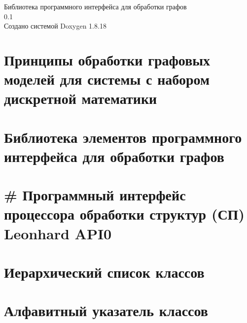 \let\mypdfximage\pdfximage\def\pdfximage{\immediate\mypdfximage}\documentclass[twoside]{book}
\newcommand{\+}{\discretionary{\mbox{\scriptsize$\hookleftarrow$}}{}{}}
\newcommand{\clearemptydoublepage}{%
  \newpage{\pagestyle{empty}\cleardoublepage}%
}
\begin{document}
\hypersetup{pageanchor=false,
             bookmarksnumbered=true,
             pdfencoding=unicode
            }
\begin{titlepage}
\vspace*{7cm}
\begin{center}%
{\Large Библиотека программного интерфейса для обработки графов \\[1ex]\large 0.\+1 }\\
\vspace*{1cm}
{\large Создано системой Doxygen 1.8.18}\\
\end{center}
\end{titlepage}
\clearemptydoublepage
{}
\tableofcontents
\clearemptydoublepage
{}
\hypersetup{pageanchor=true}

\chapter{Принципы обработки графовых моделей для системы с набором дискретной математики}
\label{md_docs__xC3_x90_xC2_x93_xC3_x91_xC2_x80_xC3_x90_xC2_xB0_xC3_x91_xC2_x84_xC3_x90_xC2_xBE_xC3_x90f53e7fcf051908d6ad51fe907e366e01}

\chapter{Библиотека элементов программного интерфейса для обработки графов}
\label{md__r_e_a_d_m_e}

\chapter{\# Программный интерфейс процессора обработки структур (СП) Leonhard A\+P\+I0}
\label{md_spu-api__readme}

\chapter{Иерархический список классов}

\chapter{Алфавитный указатель классов}

\end{document}
